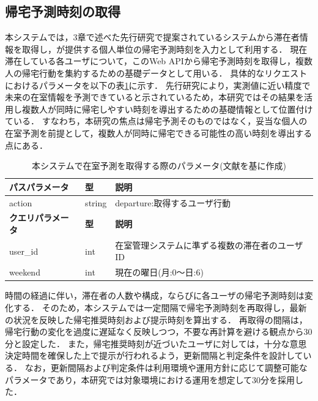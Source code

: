 \subsection{帰宅予測時刻の取得}

本システムでは，3章で述べた先行研究で提案されているシステム\cite{staywatch}から滞在者情報を取得し，\cite{hayashi}が提供する個人単位の帰宅予測時刻を入力として利用する．
現在滞在している各ユーザについて，このWeb APIから帰宅予測時刻を取得し，複数人の帰宅行動を集約するための基礎データとして用いる．
具体的なリクエストにおけるパラメータを以下の表\ref{tab:API}に示す．
先行研究により，実測値に近い精度で未来の在室情報を予測できていると示されているため，本研究ではその結果を活用し複数人が同時に帰宅しやすい時刻を導出するための基礎情報として位置付けている．
すなわち，本研究の焦点は帰宅予測そのものではなく，妥当な個人の在室予測を前提として，複数人が同時に帰宅できる可能性の高い時刻を導出する点にある．


\begin{table}[htb]
  \centering
  \caption{本システムで在室予測を取得する際のパラメータ(文献\cite{hayashi}を基に作成)}
  \label{tab:API}
  \begin{tabular}{|l|l|l|}
    \hline
    \textbf{パスパラメータ}  & \textbf{型} & \textbf{説明}              \\
    \hline
    action            & string     & departure:取得するユーザ行動      \\
    \hline
    \textbf{クエリパラメータ} & \textbf{型} & \textbf{説明}              \\
    \hline
    user\_id          & int        & 在室管理システムに準ずる複数の滞在者のユーザID \\
    weekend           & int        & 現在の曜日(月:0〜日:6)           \\
    \hline
  \end{tabular}
\end{table}



時間の経過に伴い，滞在者の人数や構成，ならびに各ユーザの帰宅予測時刻は変化する．
そのため，本システムでは一定間隔で帰宅予測時刻を再取得し，最新の状況を反映した帰宅推奨時刻および提示時刻を算出する．
再取得の間隔は，帰宅行動の変化を過度に遅延なく反映しつつ，不要な再計算を避ける観点から30分と設定した．
また，帰宅推奨時刻が近づいたユーザに対しては，十分な意思決定時間を確保した上で提示が行われるよう，更新間隔と判定条件を設計している．
なお，更新間隔および判定条件は利用環境や運用方針に応じて調整可能なパラメータであり，本研究では対象環境における運用を想定して30分を採用した．